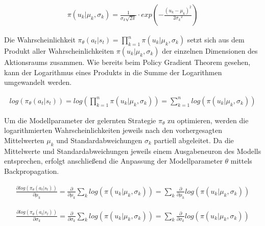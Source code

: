 \begin{equation}
\begin{aligned}
\pi(u_k | \mu_k, \sigma_k) = \frac{1}{\sigma_k \sqrt{2 \pi}}
    \cdot exp(-\frac{(u_k - \mu_k)^2}{2 {\sigma_k}^2})
\end{aligned}
\end{equation}

Die Wahrscheinlichkeit $\pi_\theta(a_t | s_t) = \prod_{k=1}^n \pi(u_k | \mu_k, \sigma_k)$
setzt sich aus dem Produkt aller Wahrscheinlichkeiten $\pi(u_k | \mu_k, \sigma_k)$
der einzelnen Dimensionen des Aktionsraums zusammen. Wie bereits beim Policy Gradient
Theorem gesehen, kann der Logarithmus eines Produkts in die Summe der Logarithmen
umgewandelt werden.

\begin{equation}
\begin{aligned}
log(\pi_\theta(a_t | s_t)) = log\left(\prod_{k=1}^n \pi(u_k | \mu_k, \sigma_k)\right)
    = \sum_{k=1}^n log (\pi(u_k | \mu_k, \sigma_k))
\end{aligned}
\end{equation}

Um die Modellparameter der gelernten Strategie $\pi_\theta$ zu optimieren, werden
die logarithmierten Wahrscheinlichkeiten jeweils nach den vorhergesagten Mittelwerten
$\mu_k$ und Standardabweichungen $\sigma_k$ partiell abgeleitet. Da die Mittelwerte
und Standardabweichungen jeweils einem Ausgabeneuron des Modells entsprechen, erfolgt
anschließend die Anpassung der Modellparameter $\theta$ mittels Backpropagation.

\begin{equation}
\begin{aligned}
\frac{\partial log(\pi_\theta(a_t | s_t))}{\partial \mu_k}
    = \frac{\partial}{\partial \mu_k} \sum_k log(\pi(u_k | \mu_k, \sigma_k))
    =  \sum_k \frac{\partial}{\partial \mu_k} log(\pi(u_k | \mu_k, \sigma_k))
\end{aligned}
\end{equation}

\begin{equation}
\begin{aligned}
\frac{\partial log(\pi_\theta(a_t | s_t))}{\partial \sigma_k}
    = \frac{\partial}{\partial \sigma_k} \sum_k log(\pi(u_k | \mu_k, \sigma_k))
    =  \sum_k \frac{\partial}{\partial \sigma_k} log(\pi(u_k | \mu_k, \sigma_k))
\end{aligned}
\end{equation}

